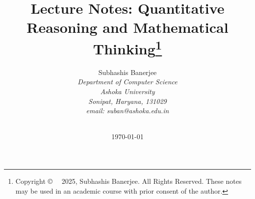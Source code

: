 \documentclass{book}
\begin{document}
\title{\Large\bf Lecture Notes: Quantitative Reasoning and Mathematical Thinking\footnote{
Copyright \copyright~~  2025, Subhashis Banerjee.
 All Rights Reserved. These notes may be used in an academic
course with prior consent of the author.}
}

\author{Subhashis Banerjee\\[2mm]
{\em	Department of Computer Science } \\
{\em	Ashoka University} \\
{\em	Sonipat, Haryana, 131029 }\\
{\em	email: suban@ashoka.edu.in} \\
\\
}

\date{\today}

\maketitle
\tableofcontents










\end{document}
